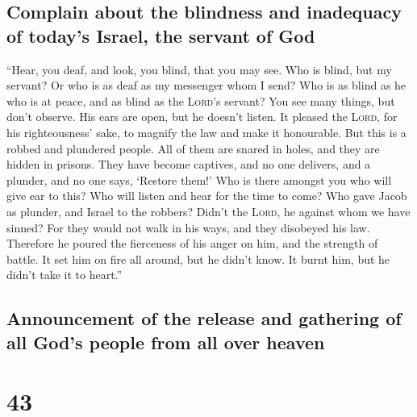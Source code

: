 \hypertarget{complain-about-the-blindness-and-inadequacy-of-todays-israel-the-servant-of-god}{%
\subsection{Complain about the blindness and inadequacy of today's
Israel, the servant of
God}\label{complain-about-the-blindness-and-inadequacy-of-todays-israel-the-servant-of-god}}

 ``Hear, you deaf, and look, you blind, that you may see.
 Who is blind, but my servant? Or who is as deaf as my
messenger whom I send? Who is as blind as he who is at peace, and as
blind as the \textsc{Lord}'s servant?  You see many
things, but don't observe. His ears are open, but he doesn't listen.
 It pleased the \textsc{Lord}, for his righteousness'
sake, to magnify the law and make it honourable.  But
this is a robbed and plundered people. All of them are snared in holes,
and they are hidden in prisons. They have become captives, and no one
delivers, and a plunder, and no one says, `Restore them!'
 Who is there amongst you who will give ear to this? Who
will listen and hear for the time to come?  Who gave
Jacob as plunder, and Israel to the robbers? Didn't the \textsc{Lord},
he against whom we have sinned? For they would not walk in his ways, and
they disobeyed his law.  Therefore he poured the
fierceness of his anger on him, and the strength of battle. It set him
on fire all around, but he didn't know. It burnt him, but he didn't take
it to heart.''

\hypertarget{announcement-of-the-release-and-gathering-of-all-gods-people-from-all-over-heaven}{%
\subsection{Announcement of the release and gathering of all God's
people from all over
heaven}\label{announcement-of-the-release-and-gathering-of-all-gods-people-from-all-over-heaven}}

\hypertarget{section-42}{%
\section{43}\label{section-42}}


